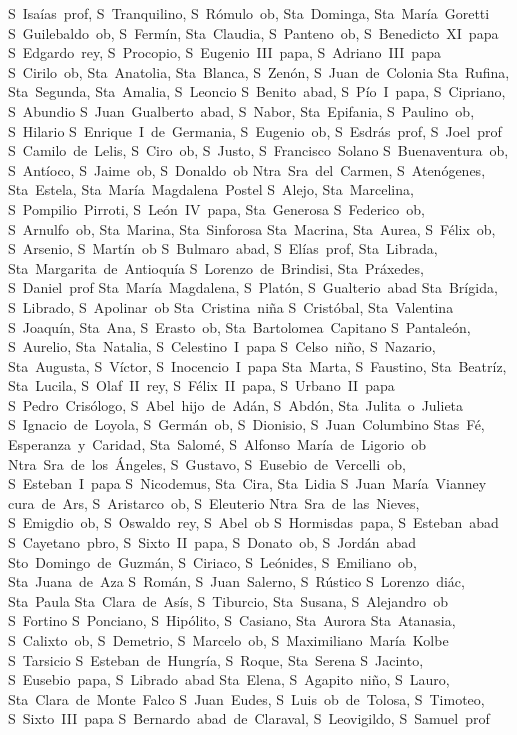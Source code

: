S~Isa\'ias~prof, S~Tranquilino, S~R\'omulo~ob, Sta~Dominga, Sta~Mar\'ia~Goretti
S~Guilebaldo~ob, S~Ferm\'in, Sta~Claudia, S~Panteno~ob, S~Benedicto~XI~papa
S~Edgardo~rey, S~Procopio, S~Eugenio~III~papa, S~Adriano~III~papa
S~Cirilo~ob, Sta~Anatolia, Sta~Blanca, S~Zen\'on, S~Juan~de~Colonia
Sta~Rufina, Sta~Segunda, Sta~Amalia, S~Leoncio
S~Benito~abad, S~P\'io~I~papa, S~Cipriano, S~Abundio
S~Juan~Gualberto~abad, S~Nabor, Sta~Epifania, S~Paulino~ob, S~Hilario
S~Enrique~I~de~Germania, S~Eugenio~ob, S~Esdr\'as~prof, S~Joel~prof
S~Camilo~de~Lelis, S~Ciro~ob, S~Justo, S~Francisco~Solano
S~Buenaventura~ob, S~Ant\'ioco, S~Jaime~ob, S~Donaldo~ob
Ntra~Sra~del~Carmen, S~Aten\'ogenes, Sta~Estela, Sta~Mar\'ia~Magdalena~Postel
S~Alejo, Sta~Marcelina, S~Pompilio~Pirroti, S~Le\'on~IV~papa, Sta~Generosa
S~Federico~ob, S~Arnulfo~ob, Sta~Marina, Sta~Sinforosa
Sta~Macrina, Sta~Aurea, S~F\'elix~ob, S~Arsenio, S~Mart\'in~ob
S~Bulmaro~abad, S~El\'ias~prof, Sta~Librada, Sta~Margarita~de~Antioqu\'ia
S~Lorenzo~de~Brindisi, Sta~Pr\'axedes, S~Daniel~prof
Sta~Mar\'ia~Magdalena, S~Plat\'on, S~Gualterio~abad
Sta~Br\'igida, S~Librado, S~Apolinar~ob
Sta~Cristina~ni\~na
S~Crist\'obal, Sta~Valentina
S~Joaqu\'in, Sta~Ana, S~Erasto~ob, Sta~Bartolomea~Capitano
S~Pantale\'on, S~Aurelio, Sta~Natalia, S~Celestino~I~papa
S~Celso~ni\~no, S~Nazario, Sta~Augusta, S~V\'ictor, S~Inocencio~I~papa
Sta~Marta, S~Faustino, Sta~Beatr\'iz, Sta~Lucila, S~Olaf~II~rey, S~F\'elix~II~papa, S~Urbano~II~papa
S~Pedro~Cris\'ologo, S~Abel~hijo~de~Ad\'an, S~Abd\'on, Sta~Julita~o~Julieta
S~Ignacio~de~Loyola, S~Germ\'an~ob, S~Dionisio, S~Juan~Columbino
Stas~F\'e, Esperanza~y~Caridad, Sta~Salom\'e, S~Alfonso~Mar\'ia~de~Ligorio~ob
Ntra~Sra~de~los~\'Angeles, S~Gustavo, S~Eusebio~de~Vercelli~ob, S~Esteban~I~papa
S~Nicodemus, Sta~Cira, Sta~Lidia
S~Juan~Mar\'ia~Vianney cura~de~Ars, S~Aristarco~ob, S~Eleuterio
Ntra~Sra~de~las~Nieves, S~Emigdio~ob, S~Oswaldo~rey, S~Abel~ob
S~Hormisdas~papa, S~Esteban~abad
S~Cayetano~pbro, S~Sixto~II~papa, S~Donato~ob, S~Jord\'an~abad
Sto~Domingo~de~Guzm\'an, S~Ciriaco, S~Le\'onides, S~Emiliano~ob, Sta~Juana~de~Aza
S~Rom\'an, S~Juan~Salerno, S~R\'ustico
S~Lorenzo~di\'ac, Sta~Paula
Sta~Clara~de~As\'is, S~Tiburcio, Sta~Susana, S~Alejandro~ob
S~Fortino
S~Ponciano, S~Hip\'olito, S~Casiano, Sta~Aurora
Sta~Atanasia, S~Calixto~ob, S~Demetrio, S~Marcelo~ob, S~Maximiliano~Mar\'ia~Kolbe
S~Tarsicio
S~Esteban~de~Hungr\'ia, S~Roque, Sta~Serena
S~Jacinto, S~Eusebio~papa, S~Librado~abad
Sta~Elena, S~Agapito~ni\~no, S~Lauro, Sta~Clara~de~Monte~Falco
S~Juan~Eudes, S~Luis~ob~de~Tolosa, S~Timoteo, S~Sixto~III~papa
S~Bernardo~abad~de~Claraval, S~Leovigildo, S~Samuel~prof
